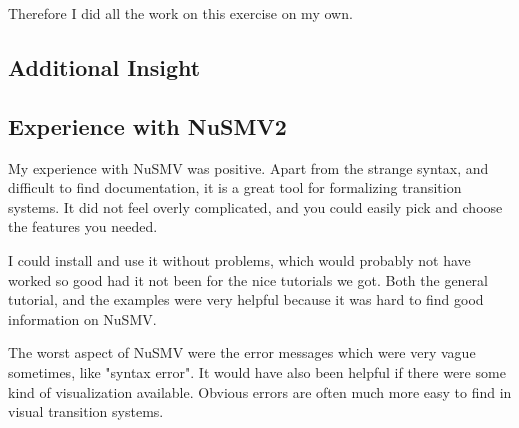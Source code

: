 \documentclass[12pt, a4paper]{article}
\begin{document}
Therefore I did all the work on this exercise on my own.

\subsection{Additional Insight}

\subsection{Experience with NuSMV2}
My experience with NuSMV was positive. Apart from the strange syntax, and difficult to find documentation, it is a great tool for formalizing transition systems. It did not feel overly complicated, and you could easily pick and choose the features you needed.

I could install and use it without problems, which would probably not have worked so good had it not been for the nice tutorials we got. Both the general tutorial, and the examples were very helpful because it was hard to find good information on NuSMV.

The worst aspect of NuSMV were the error messages which were very vague sometimes, like "syntax error". It would have also been helpful if there were some kind of visualization available. Obvious errors are often much more easy to find in visual transition systems.
\end{document}
